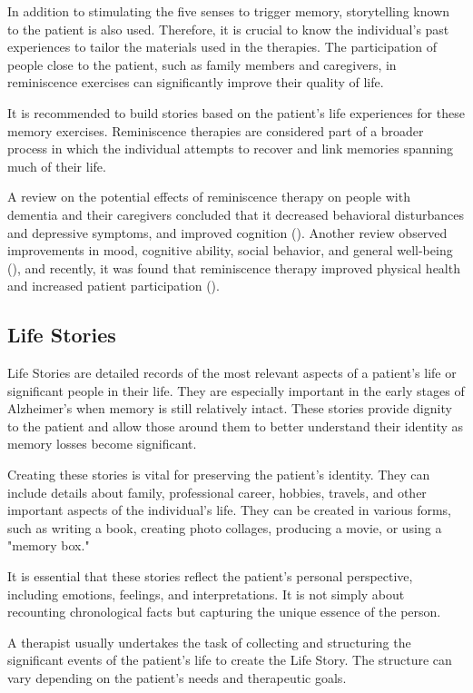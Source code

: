 In addition to stimulating the five senses to trigger memory, storytelling known to the patient is also used. Therefore, it is crucial to know the individual's past experiences to tailor the materials used in the therapies. The participation of people close to the patient, such as family members and caregivers, in reminiscence exercises can significantly improve their quality of life.

It is recommended to build stories based on the patient's life experiences for these memory exercises. Reminiscence therapies are considered part of a broader process in which the individual attempts to recover and link memories spanning much of their life.

A review on the potential effects of reminiscence therapy on people with dementia and their caregivers concluded that it decreased behavioral disturbances and depressive symptoms, and improved cognition (\cite{huang2015reminiscence}). Another review observed improvements in mood, cognitive ability, social behavior, and general well-being (\cite{cotelli2012reminiscence}), and recently, it was found that reminiscence therapy improved physical health and increased patient participation (\cite{irazoki2027eficacia}).

\subsection{Life Stories}
Life Stories are detailed records of the most relevant aspects of a patient's life or significant people in their life. They are especially important in the early stages of Alzheimer's when memory is still relatively intact. These stories provide dignity to the patient and allow those around them to better understand their identity as memory losses become significant.

Creating these stories is vital for preserving the patient's identity. They can include details about family, professional career, hobbies, travels, and other important aspects of the individual's life. They can be created in various forms, such as writing a book, creating photo collages, producing a movie, or using a "memory box."

It is essential that these stories reflect the patient's personal perspective, including emotions, feelings, and interpretations. It is not simply about recounting chronological facts but capturing the unique essence of the person.

A therapist usually undertakes the task of collecting and structuring the significant events of the patient's life to create the Life Story. The structure can vary depending on the patient's needs and therapeutic goals.

